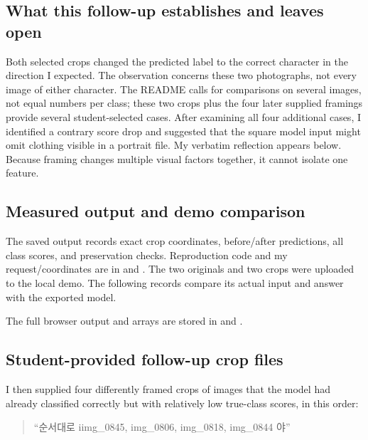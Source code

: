 \documentclass[11pt]{article}
\begin{document}
\subsection*{What this follow-up establishes and leaves open}
Both selected crops changed the predicted label to the correct character in the direction I expected. The observation concerns these two photographs, not every image of either character. The README calls for comparisons on several images, not equal numbers per class; these two crops plus the four later supplied framings provide several student-selected cases. After examining all four additional cases, I identified a contrary score drop and suggested that the square model input might omit clothing visible in a portrait file. My verbatim reflection appears below. Because framing changes multiple visual factors together, it cannot isolate one feature.

\clearpage
\subsection*{Measured output and demo comparison}
The saved output records exact crop coordinates, before/after predictions, all class scores, and preservation checks. Reproduction code and my request/coordinates are in  and .
The two originals and two crops were uploaded to the local demo. The following records compare its actual input and answer with the exported model.
\par\noindent\begin{minipage}{\linewidth}
\end{minipage}\par\medskip
The full browser output and arrays are stored in  and .



\clearpage
\subsection*{Student-provided follow-up crop files}
\label{p7:student_provided_crops}
I then supplied four differently framed crops of images that the model had already classified correctly but with relatively low true-class scores, in this order:
\begin{quote}
``순서대로 iimg\_0845, img\_0806, img\_0818, img\_0844 야''
\end{quote}
\end{document}
